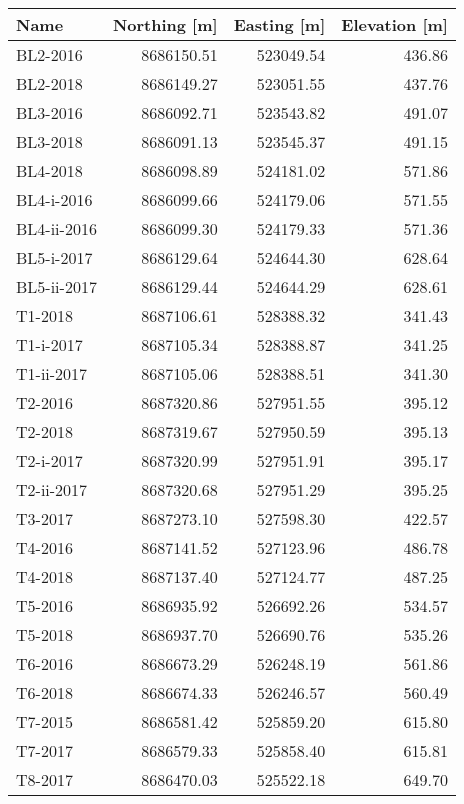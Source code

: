 \begin{tabular}{lrrr}
\toprule
        Name &  Northing [m] &  Easting [m] &  Elevation [m] \\
\midrule
    BL2-2016 &    8686150.51 &    523049.54 &         436.86 \\
    BL2-2018 &    8686149.27 &    523051.55 &         437.76 \\
    BL3-2016 &    8686092.71 &    523543.82 &         491.07 \\
    BL3-2018 &    8686091.13 &    523545.37 &         491.15 \\
    BL4-2018 &    8686098.89 &    524181.02 &         571.86 \\
  BL4-i-2016 &    8686099.66 &    524179.06 &         571.55 \\
 BL4-ii-2016 &    8686099.30 &    524179.33 &         571.36 \\
  BL5-i-2017 &    8686129.64 &    524644.30 &         628.64 \\
 BL5-ii-2017 &    8686129.44 &    524644.29 &         628.61 \\
     T1-2018 &    8687106.61 &    528388.32 &         341.43 \\
   T1-i-2017 &    8687105.34 &    528388.87 &         341.25 \\
  T1-ii-2017 &    8687105.06 &    528388.51 &         341.30 \\
     T2-2016 &    8687320.86 &    527951.55 &         395.12 \\
     T2-2018 &    8687319.67 &    527950.59 &         395.13 \\
   T2-i-2017 &    8687320.99 &    527951.91 &         395.17 \\
  T2-ii-2017 &    8687320.68 &    527951.29 &         395.25 \\
     T3-2017 &    8687273.10 &    527598.30 &         422.57 \\
     T4-2016 &    8687141.52 &    527123.96 &         486.78 \\
     T4-2018 &    8687137.40 &    527124.77 &         487.25 \\
     T5-2016 &    8686935.92 &    526692.26 &         534.57 \\
     T5-2018 &    8686937.70 &    526690.76 &         535.26 \\
     T6-2016 &    8686673.29 &    526248.19 &         561.86 \\
     T6-2018 &    8686674.33 &    526246.57 &         560.49 \\
     T7-2015 &    8686581.42 &    525859.20 &         615.80 \\
     T7-2017 &    8686579.33 &    525858.40 &         615.81 \\
     T8-2017 &    8686470.03 &    525522.18 &         649.70 \\
\bottomrule
\end{tabular}
